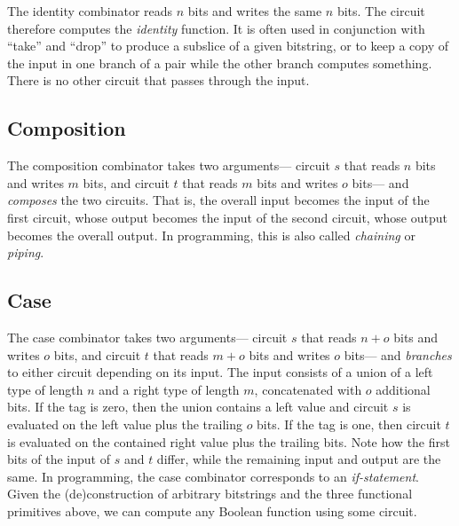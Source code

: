 
%
The identity combinator reads $n$ bits and writes the same $n$ bits.
The circuit therefore computes the \emph{identity} function.
%
It is often used in conjunction with \enquote{take} and \enquote{drop}
to produce a subslice of a given bitstring,
or to keep a copy of the input in one branch of a pair while the other branch computes something.
There is no other circuit that passes through the input.

\subsection{Composition}


%
The composition combinator takes two arguments---%
circuit $s$ that reads $n$ bits and writes $m$ bits,
and circuit $t$ that reads $m$ bits and writes $o$ bits---%
and \emph{composes} the two circuits.
That is,
the overall input becomes the input of the first circuit,
whose output becomes the input of the second circuit,
whose output becomes the overall output.
%
In programming, this is also called \emph{chaining} or \emph{piping}.

\subsection{Case}


%
The case combinator takes two arguments---%
circuit $s$ that reads $n + o$ bits and writes $o$ bits,
and circuit $t$ that reads $m + o$ bits and writes $o$ bits---%
and \emph{branches} to either circuit depending on its input.
The input consists of a union of a left type of length $n$ and a right type of length $m$,
concatenated with $o$ additional bits.
If the tag is zero,
then the union contains a left value and circuit $s$ is evaluated on the left value plus the trailing $o$ bits.
If the tag is one,
then circuit $t$ is evaluated on the contained right value plus the trailing bits.
Note how the first bits of the input of $s$ and $t$ differ,
while the remaining input and output are the same.
%
In programming,
the case combinator corresponds to an \emph{if-statement}.
Given the (de)construction of arbitrary bitstrings and the three functional primitives above,
we can compute any Boolean function using some circuit.

%

